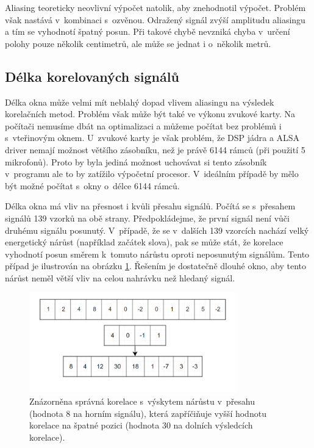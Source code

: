 Aliasing teoreticky neovlivní výpočet natolik, aby znehodnotil výpočet. Problém však nastává v~kombinaci s~ozvěnou. Odražený signál zvýší amplitudu aliasingu a tím se vyhodnotí špatný posun. Při takové chybě nevzniká chyba v~určení polohy pouze několik centimetrů, ale může se jednat i o~několik metrů. 

\subsection{Délka korelovaných signálů}

Délka okna může velmi mít neblahý dopad vlivem aliasingu na výsledek korelačních metod. Problém však může být také ve výkonu zvukové karty. Na počítači nemusíme dbát na optimalizaci a můžeme počítat bez problémů i s~vteřinovým oknem. U~zvukové karty je však problém, že DSP jádra a ALSA driver nemají možnost většího zásobníku, než je právě 6144 rámců (při použití 5 mikrofonů). Proto by byla jediná možnost uchovávat si tento zásobník v~programu ale to by zatížilo výpočetní procesor. V~ideálním případě by mělo být možné počítat s~okny o~délce 6144 rámců.

Délka okna má vliv na přesnost i kvůli přesahu signálů. Počítá se s~přesahem signálů 139 vzorků na obě strany. Předpokládejme, že první signál není vůči druhému signálu posunutý. V~případě, že se v~dalších 139 vzorcích nachází velký energetický nárůst (například začátek slova), pak se může stát, že korelace vyhodnotí posun směrem k~tomuto nárůstu oproti neposunutým signálům. Tento případ je ilustrován na obrázku \ref{pic:chybakorelace}. Řešením je dostatečně dlouhé okno, aby tento nárůst neměl větší vliv na celou nahrávku než hledaný signál.

\begin{figure}[!ht]
	\centering
	\includegraphics[width=0.8\textwidth]{obrazky-figures/5.png}
	\caption{Znázorněna správná korelace s~výskytem nárůstu v~přesahu (hodnota 8 na horním signálu), která zapříčiňuje vyšší hodnotu korelace na špatné pozici (hodnota 30 na dolních výsledcích korelace).}
	\label{pic:chybakorelace}
\end{figure}

